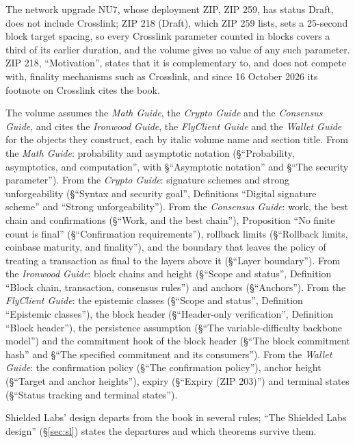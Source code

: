 \documentclass[11pt,a4paper]{article}
\theoremstyle{definition}
\begin{document}
The network upgrade NU7, whose deployment ZIP, ZIP 259, has status Draft,
does not include Crosslink; ZIP 218 (Draft), which ZIP 259 lists, sets a
25-second block target spacing, so every Crosslink parameter counted in
blocks covers a third of its earlier duration, and the volume gives no value
of any such parameter.
ZIP 218, ``Motivation'', states that it is complementary to, and does not
compete with, finality mechanisms such as Crosslink, and since 16 October 2026
its footnote on Crosslink cites the book.

The volume assumes the \emph{Math Guide}, the \emph{Crypto Guide} and the
\emph{Consensus Guide}, and cites the \emph{Ironwood Guide}, the
\emph{FlyClient Guide} and the \emph{Wallet Guide} for the objects they
construct, each by italic volume name and section title. From the \emph{Math
Guide}: probability and asymptotic notation (\S``Probability, asymptotics,
and computation'', with \S``Asymptotic notation'' and \S``The security
parameter''). From the \emph{Crypto Guide}: signature schemes and strong
unforgeability (\S``Syntax and security goal'', Definitions ``Digital
signature scheme'' and ``Strong unforgeability''). From the \emph{Consensus
Guide}: work, the best chain and confirmations (\S``Work, and the best
chain''), Proposition ``No finite count is final'' (\S``Confirmation
requirements''), rollback limits (\S``Rollback limits, coinbase
maturity, and finality''), and the boundary that leaves the policy of
treating a transaction as final to the layers above it (\S``Layer
boundary''). From the \emph{Ironwood Guide}: block chains and
height (\S``Scope and status'', Definition ``Block chain, transaction,
consensus rules'') and anchors (\S``Anchors''). From the \emph{FlyClient
Guide}: the epistemic classes (\S``Scope and status'', Definition
``Epistemic classes''), the block header (\S``Header-only verification'',
Definition ``Block header''), the persistence assumption (\S``The
variable-difficulty backbone model'') and the commitment hook of the block
header (\S``The block commitment hash'' and \S``The specified commitment and
its consumers''). From the \emph{Wallet Guide}: the confirmation policy
(\S``The confirmation policy''), anchor height (\S``Target and anchor
heights''), expiry (\S``Expiry (ZIP 203)'') and terminal states
(\S``Status tracking and terminal states'').

Shielded Labs' design departs from the book in several rules; ``The Shielded
Labs design'' (\S\ref{sec:sl}) states the departures and which theorems
survive them.
\end{document}
